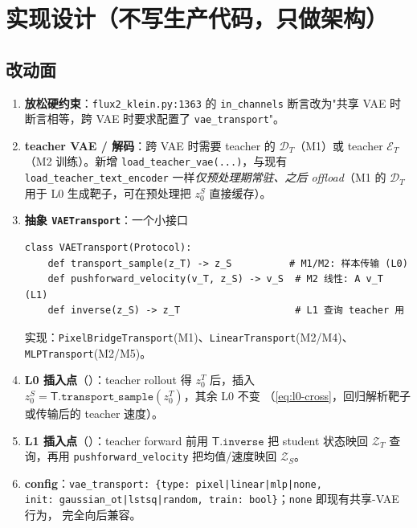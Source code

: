 \documentclass[11pt,a4paper]{article}
\newcommand{\Enc}{\mathcal{E}}
\newcommand{\Dec}{\mathcal{D}}
\newcommand{\Zt}{\mathcal{Z}_T}
\newcommand{\Zs}{\mathcal{Z}_S}
\newcommand{\Tmap}{\mathsf{T}}
\theoremstyle{definition}
\begin{document}
\section{实现设计（不写生产代码，只做架构）}
\label{sec:impl}

\subsection{改动面}

\begin{enumerate}[leftmargin=1.5em]
\item \textbf{放松硬约束}：\texttt{flux2\_klein.py:1363} 的 \texttt{in\_channels}
断言改为"共享 VAE 时断言相等，跨 VAE 时要求配置了 \texttt{vae\_transport}"。
\item \textbf{teacher VAE / 解码}：跨 VAE 时需要 teacher 的 $\Dec_T$（M1）或 teacher
$\Enc_T$（M2 训练）。新增 \texttt{load\_teacher\_vae(...)}，与现有
\texttt{load\_teacher\_text\_encoder} 一样\emph{仅预处理期常驻、之后 offload}（M1 的
$\Dec_T$ 用于 L0 生成靶子，可在预处理把 $z_0^S$ 直接缓存）。
\item \textbf{抽象 \texttt{VAETransport}}：一个小接口
\begin{verbatim}
class VAETransport(Protocol):
    def transport_sample(z_T) -> z_S          # M1/M2: 样本传输 (L0)
    def pushforward_velocity(v_T, z_S) -> v_S  # M2 线性: A v_T (L1)
    def inverse(z_S) -> z_T                    # L1 查询 teacher 用
\end{verbatim}
实现：\texttt{PixelBridgeTransport}(M1)、\texttt{LinearTransport}(M2/M4)、
\texttt{MLPTransport}(M2/M5)。
\item \textbf{L0 插入点}（）：teacher rollout 得
$z_0^T$ 后，插入 $z_0^S=\Tmap.\texttt{transport\_sample}(z_0^T)$，其余 L0 不变
（\eqref{eq:l0-cross}，回归解析靶子或传输后的 teacher 速度）。
\item \textbf{L1 插入点}（）：teacher
forward 前用 $\Tmap.\texttt{inverse}$ 把 student 状态映回 $\Zt$ 查询，再用
\texttt{pushforward\_velocity} 把均值/速度映回 $\Zs$。
\item \textbf{config}：\texttt{vae\_transport:
\{type: pixel|linear|mlp|none,}\\
\texttt{init: gaussian\_ot|lstsq|random, train: bool\}}；\texttt{none} 即现有共享-VAE 行为，
完全向后兼容。
\end{enumerate}
\end{document}
